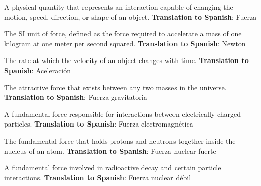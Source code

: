 \begin{vocabulary}[Force]
A physical quantity that represents an interaction capable of changing the motion, speed, direction, or shape of an object. \newline
\textbf{Translation to Spanish}: Fuerza \newline
\end{vocabulary}

\begin{vocabulary}[Newton]
The SI unit of force, defined as the force required to accelerate a mass of one kilogram at one meter per second squared. \newline
\textbf{Translation to Spanish}: Newton \newline
\end{vocabulary}

\begin{vocabulary}[Acceleration]
The rate at which the velocity of an object changes with time. \newline
\textbf{Translation to Spanish}: Aceleración \newline
\end{vocabulary}

\begin{vocabulary}
The attractive force that exists between any two masses in the universe. \newline
\textbf{Translation to Spanish}: Fuerza gravitatoria \newline
\end{vocabulary}

\begin{vocabulary}
A fundamental force responsible for interactions between electrically charged particles. \newline
\textbf{Translation to Spanish}: Fuerza electromagnética \newline
\end{vocabulary}

\begin{vocabulary}
The fundamental force that holds protons and neutrons together inside the nucleus of an atom. \newline
\textbf{Translation to Spanish}: Fuerza nuclear fuerte \newline
\end{vocabulary}

\begin{vocabulary}
A fundamental force involved in radioactive decay and certain particle interactions. \newline
\textbf{Translation to Spanish}: Fuerza nuclear débil \newline
\end{vocabulary}


